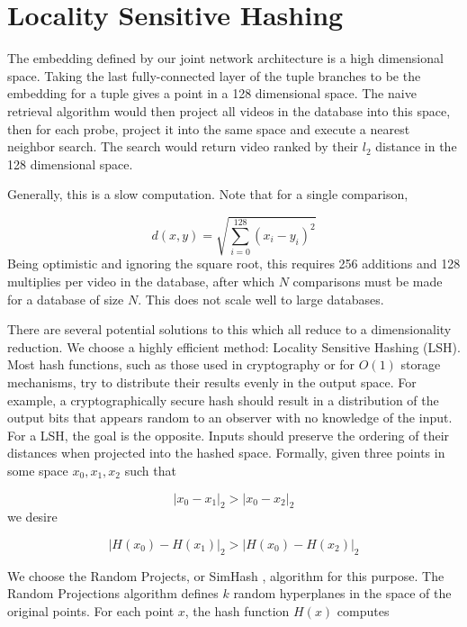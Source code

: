 \section{Locality Sensitive Hashing}\label{sec:hashing}

The embedding defined by our joint network architecture is a high dimensional space. Taking the last fully-connected layer of the tuple branches to be the embedding for a tuple gives a point in a 128 dimensional space. The naive retrieval algorithm would then project all videos in the database into this space, then for each probe, project it into the same space and execute a nearest neighbor search. The search would return video ranked by their $l_2$ distance in the 128 dimensional space.

Generally, this is a slow computation. Note that for a single comparison, 

\begin{equation}
    d(x, y) = \sqrt{\sum_{i=0}^{128} (x_i - y_i)^2}
\end{equation} 
Being optimistic and ignoring the square root, this requires 256 additions and 128 multiplies per video in the database, after which $N$ comparisons must be made for a database of size $N$. This does not scale well to large databases.

There are several potential solutions to this which all reduce to a dimensionality reduction. We choose a highly efficient method: Locality Sensitive Hashing (LSH). Most hash functions, such as those used in cryptography or for $O(1)$ storage mechanisms, try to distribute their results evenly in the output space. For example, a cryptographically secure hash should result in a distribution of the output bits that appears random to an observer with no knowledge of the input. For a LSH, the goal is the opposite. Inputs should preserve the ordering of their distances when projected into the hashed space. Formally, given three points in some space $x_0, x_1, x_2$ such that 

\begin{equation}
|x_0 - x_1|_2 > |x_0 - x_2|_2
\end{equation}
we desire

\begin{equation}
|H(x_0) - H(x_1)|_2 > |H(x_0) - H(x_2)|_2
\end{equation}

We choose the Random Projects, or SimHash \cite{charikar2002similarity}, algorithm for this purpose. The Random Projections algorithm defines $k$ random hyperplanes in the space of the original points. For each point $x$, the hash function $H(x)$ computes

